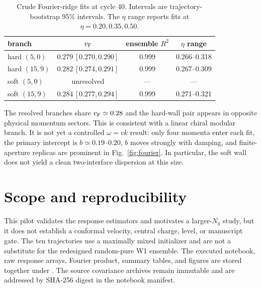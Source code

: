 \documentclass[aps,prx,twocolumn,superscriptaddress,nofootinbib,floatfix]{revtex4-2}
\begin{document}
\begin{table}[b]
\caption{Crude Fourier-ridge fits at cycle 40.  Intervals are trajectory-bootstrap 95\%
intervals.  The $\eta$ range reports fits at $\eta=0.20,0.35,0.50$.}
\label{tab:ridge}
\begin{ruledtabular}
\begin{tabular}{lccc}
branch & $v_{\rm F}$ & ensemble $R^2$ & $\eta$ range\\
\hline
hard $(5,0)$ & $0.279\,[0.270,0.290]$ & 0.999 & 0.266--0.318\\
hard $(15,9)$ & $0.282\,[0.274,0.291]$ & 0.999 & 0.267--0.309\\
soft $(5,0)$ & unresolved & --- & ---\\
soft $(15,9)$ & $0.284\,[0.277,0.294]$ & 0.999 & 0.271--0.321\\
\end{tabular}
\end{ruledtabular}
\end{table}

The resolved branches share $v_{\rm F}\simeq0.28$ and the hard-wall pair appears in
opposite physical momentum sectors.  This is consistent with a linear chiral modular
branch.  It is not yet a controlled $\omega=v k$ result: only four momenta enter each fit,
the primary intercept is $b\simeq0.19$--$0.20$, $b$ moves strongly with damping, and
finite-aperture replicas are prominent in Fig.~\ref{fig:fourier}.  In particular, the soft
wall does not yield a clean two-interface dispersion at this size.

\section{Scope and reproducibility}

This pilot validates the response estimators and motivates a larger-$N_y$ study, but it
does not establish a conformal velocity, central charge, level, or manuscript gate.  The
ten trajectories use a maximally mixed initializer and are not a substitute for the
redesigned random-pure W1 ensemble.  The executed notebook, raw response arrays, Fourier
product, summary tables, and figures are stored together under
.  The source covariance archives remain
immutable and are addressed by SHA-256 digest in the notebook manifest.
\end{document}
